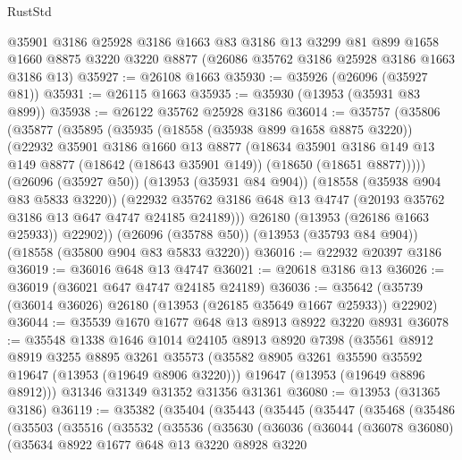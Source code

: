 \begin{lexlean}{RustStd}
\begin{coremodule}
    @35901
    @3186
    @25928
    @3186
    @1663
    @83
    @3186
    @13
    @3299
    @81
    @899
    @1658
    @1660
    @8875
    @3220
    @3220
    @8877
    (@26086 @35762 @3186 @25928 @3186 @1663 @3186 @13)
@35927 := @26108 @1663
@35930 := @35926 (@26096 (@35927 @81))
@35931 := @26115 @1663
@35935 := @35930 (@13953 (@35931 @83 @899))
@35938 := @26122 @35762 @25928 @3186
@36014 := @35757
    (@35806
      (@35877
        (@35895
          (@35935
            (@18558 (@35938 @899 @1658 @8875 @3220))
            (@22932
              @35901
              @3186
              @1660
              @13
              @8877
              (@18634
                @35901
                @3186
                @149
                @13
                @149
                @8877
                (@18642 (@18643 @35901 @149))
                (@18650 (@18651 @8877)))))
          (@26096 (@35927 @50))
          (@13953 (@35931 @84 @904))
          (@18558 (@35938 @904 @83 @5833 @3220))
          (@22932 @35762 @3186 @648 @13 @4747 (@20193 @35762 @3186 @13 @647 @4747 @24185 @24189)))
        @26180
        (@13953 (@26186 @1663 @25933))
        @22902))
    (@26096 (@35788 @50))
    (@13953 (@35793 @84 @904))
    (@18558 (@35800 @904 @83 @5833 @3220))
@36016 := @22932 @20397 @3186
@36019 := @36016 @648 @13 @4747
@36021 := @20618 @3186 @13
@36026 := @36019 (@36021 @647 @4747 @24185 @24189)
@36036 := @35642 (@35739 (@36014 @36026) @26180 (@13953 (@26185 @35649 @1667 @25933)) @22902)
@36044 := @35539 @1670 @1677 @648 @13 @8913 @8922 @3220 @8931
@36078 := @35548
    @1338
    @1646
    @1014
    @24105
    @8913
    @8920
    @7398
    (@35561
      @8912
      @8919
      @3255
      @8895
      @3261
      @35573
      (@35582 @8905 @3261 @35590 @35592 @19647 (@13953 (@19649 @8906 @3220)))
      @19647
      (@13953 (@19649 @8896 @8912)))
    @31346
    @31349
    @31352
    @31356
    @31361
@36080 := @13953 (@31365 @3186)
@36119 := @35382
    (@35404
      (@35443
        (@35445
          (@35447
            (@35468
              (@35486
                (@35503
                  (@35516
                    (@35532
                      (@35536
                        (@35630
                          (@36036
                            (@36044
                              (@36078 @36080)
                              (@35634
                                @8922
                                @1677
                                @648
                                @13
                                @3220
                                @8928
                                @3220

\end{coremodule}
\end{lexlean}
